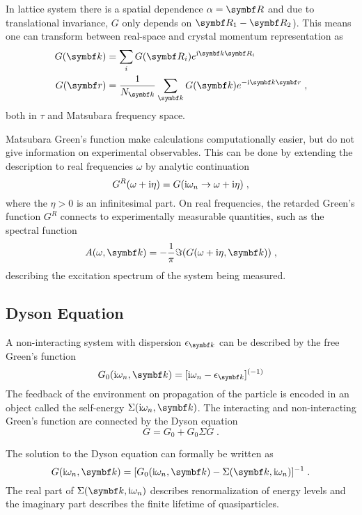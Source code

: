 \documentclass[../main.tex]{subfiles}
\begin{document}
In lattice system there is a spatial dependence \(\alpha = \vb{R}\) and due to translational invariance, \(G\) only depends on \(\vb{R}_1 - \vb{R}_2\)).
This means one can transform between real-space and crystal momentum representation as
\begin{align}
	G (\vb{k}) &= \sum_i G(\vb{R}_i) e^{\iu \vb{k} \vb{R}_i} \\
	G(\vb{r}) &= \frac{1}{N_{\vb{k}}} \sum_{\vb{k}} G(\vb{k}) e^{-\iu \vb{k} \vb{r}} \;,
\end{align}
both in \(\tau\) and Matsubara frequency space.

Matsubara Green's function make calculations computationally easier, but do not give information on experimental observables.
This can be done by extending the description to real frequencies \(\omega\) by analytic continuation \cite{bruusManyBodyQuantumTheory2004}
\begin{equation}
	G^R (\omega + \mathrm{i} \eta) = G (\mathrm{i} \omega_n \to \omega + \mathrm{i} \eta) \;,
\end{equation}
where the \(\eta > 0\) is an infinitesimal part.
On real frequencies, the retarded Green's function \(G^R\) connects to experimentally measurable quantities, such as the spectral function
\begin{equation}
	A (\omega, \vb{k}) = -\frac{1}{\pi} \Im (G (\omega + \iu \eta, \vb{k})) \;,
\end{equation}
describing the excitation spectrum of the system being measured.

\subsection*{Dyson Equation}

A non-interacting system with dispersion \(\epsilon_{\vb{k}}\) can be described by the free Green's function
\begin{equation}
	G_0 (\iu \omega_n, \vb{k}) = [\iu \omega_n - \epsilon_{\vb{k}}]^{(-1)}
\end{equation}
The feedback of the environment on propagation of the particle is encoded in an object called the self-energy \(\Sigma (\iu \omega_n, \vb{k})\).
The interacting and non-interacting Green's function are connected by the Dyson equation
\begin{equation}
	G = G_0 + G_0 \Sigma G \;.
\end{equation}

The solution to the Dyson equation can formally be written as
\begin{equation}
	G (\iu \omega_n, \vb{k}) = [G_0 (\iu \omega_n, \vb{k}) - \Sigma (\vb{k}, \iu \omega_n)]^{-1} \;.
\end{equation}
The real part of \(\Sigma (\vb{k}, \iu \omega_n)\) describes renormalization of energy levels and the imaginary part describes the finite lifetime of quasiparticles.
\end{document}
